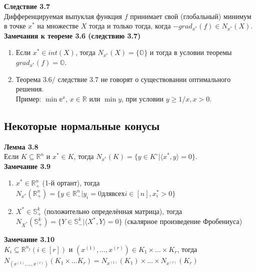 \noindent\textbf{Следствие 3.7}\\
Дифференцируемая выпуклая функция $f$ принимает свой (глобальный) минимум в точке $x^{*}$ на множестве $X$ тогда и только тогда, когда $-grad_{x^{*}}(f) \in N_{x^{*}}(X)$.\\

\noindent\textbf{Замечания к теореме 3.6 (следствию 3.7)}
\begin{enumerate}
    \item Если $x^{*} \in int(X)$, тогда $N_{x^{*}}(X) = \{\mathbb{O}\}$ и тогда в условии теоремы $grad_{x^{*}}(f) = \mathbb{O}$.
    \item Теорема 3.6/ следствие 3.7 не говорят о существовании оптимального решения.\\
Пример: $\min\mathbb{e}^x$, $x\in\mathbb{R}$ или $\min y$, при условии $y \geq 1/x, x > 0$.
\end{enumerate}

\subsection{Некоторые нормальные конусы}
\textbf{Лемма 3.8}\\
Если $K\subseteq\mathbb{R}^n$ и $x^{*} \in K$, тогда $N_{x^{*}}(K) = \{y \in K^{\circ} | \langle x^{*},y \rangle = 0\}$.\\

\noindent\textbf{Замечание 3.9}
\begin{enumerate}
    \item $x^{*} \in \mathbb{R}_{+}^{n}$ (1-й ортант), тогда $N_{x^{*}}(\mathbb{R}_{+}^{n}) = \{y\in\mathbb{R}_{-}^{n} | y_{i}=0 для всех i\in[n], x_{i}^{*}>0\}$
    \item $X^{*}\in\mathbb{S}_{+}^{k}$ (положительно определённая матрица), тогда $N_{X^{*}}(\mathbb{S}_{+}^{k}) = \{Y\in\mathbb{S}_{-}^{k} | \langle X^{*},Y \rangle = 0\}$  (скалярное произведение Фробениуса)
\end{enumerate}

\noindent\textbf{Замечание 3.10}\\
$K_{i}\subseteq\mathbb{R}^{n_{j}} (i\in[r])$ и $(x^{(1)},\ldots,x^{(r)}) \in K_{1}\times\ldots\times K_{r}$, тогда $N_{(x^{(1)},\ldots,x^{(r)})}(K_{1}\times\ldots K_{r}) = N_{x^{(1)}}(K_{1})\times\ldots\times N_{x^{(r)}}(K_{r})$

\newpage

